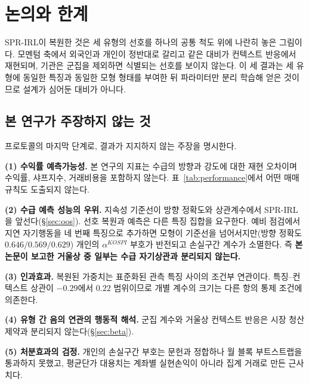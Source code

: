 %

\section{논의와 한계}
\label{sec:discussion}

SPR-IRL이 복원한 것은 세 유형의 선호를 하나의 공통 척도 위에 나란히 놓은 그림이다.
모멘텀 축에서 외국인과 개인이 정반대로 갈리고 같은 대비가 컨텍스트 반응에서
재현되며, 기관은 군집을 제외하면 식별되는 선호를 보이지 않는다. 이 세 결과는 세
유형에 동일한 특징과 동일한 모형 형태를 부여한 뒤 파라미터만 분리 학습해 얻은
것이므로 설계가 심어둔 대비가 아니다.

\subsection{본 연구가 주장하지 않는 것}
\label{sec:notclaim}

프로토콜의 마지막 단계로, 결과가 지지하지 않는 주장을 명시한다.

\textbf{(1) 수익률 예측가능성.} 본 연구의 지표는 수급의 방향과 강도에 대한 재현
오차이며 수익률, 샤프지수, 거래비용을 포함하지 않는다. 표~\ref{tab:performance}에서
어떤 매매 규칙도 도출되지 않는다.

\textbf{(2) 수급 예측 성능의 우위.} 지속성 기준선이 방향 정확도와 상관계수에서
SPR-IRL을 앞선다(\S\ref{sec:oos}). 선호 복원과 예측은 다른 특징 집합을 요구한다.
예비 점검에서 지연 자기행동을 네 번째 특징으로 추가하면 모형이 기준선을
넘어서지만(방향 정확도 $0.646/0.569/0.629$) 개인의 $\alpha^{KOSPI}$ 부호가 반전되고
손실구간 계수가 소멸한다. 즉 \textbf{본 논문이 보고한 거울상 중 일부는 수급
자기상관과 분리되지 않는다.}

\textbf{(3) 인과효과.} 복원된 가중치는 표준화된 관측 특징 사이의 조건부 연관이다.
특징--컨텍스트 상관이 $-0.29$에서 $0.22$ 범위이므로 개별 계수의 크기는 다른 항의
통제 조건에 의존한다.

\textbf{(4) 유형 간 음의 연관의 행동적 해석.} 군집 계수와 거울상 컨텍스트 반응은
시장 청산 제약과 분리되지 않는다(\S\ref{sec:beta}).

\textbf{(5) 처분효과의 검정.} 개인의 손실구간 부호는 문헌과 정합하나 월 블록
부트스트랩을 통과하지 못했고, 평균단가 대용치는 계좌별 실현손익이 아니라 집계
거래로 만든 근사치다.

